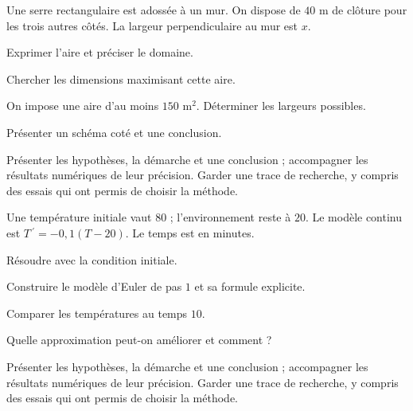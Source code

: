 \clearpage\begingroup\renewcommand{\otThumb}{}\renewcommand{\otHeadTag}{D}\label{dossiers}\label{projet-1}
Une serre rectangulaire est adossée à un mur. On dispose de $40$ m de clôture pour les trois autres côtés. La largeur perpendiculaire au mur est $x$.
\begin{questions}
\item Exprimer l’aire et préciser le domaine.
\item Chercher les dimensions maximisant cette aire.
\item On impose une aire d’au moins $150$ m$^2$. Déterminer les largeurs possibles.
\item Présenter un schéma coté et une conclusion.
\end{questions}
\vspace{5mm}\noindent Présenter les hypothèses, la démarche et une conclusion ; accompagner les résultats numériques de leur précision. Garder une trace de recherche, y compris des essais qui ont permis de choisir la méthode.\par\vfill{}\par\vspace{2mm}\noindent{}
\label{projet-2}
Une température initiale vaut $80$ ; l’environnement reste à $20$. Le modèle continu est $T\,\!^{\prime}=-0{,}1(T-20)$. Le temps est en minutes.
\begin{questions}
\item Résoudre avec la condition initiale.
\item Construire le modèle d’Euler de pas $1$ et sa formule explicite.
\item Comparer les températures au temps $10$.
\item Quelle approximation peut-on améliorer et comment ?
\end{questions}
\vspace{5mm}\noindent Présenter les hypothèses, la démarche et une conclusion ; accompagner les résultats numériques de leur précision. Garder une trace de recherche, y compris des essais qui ont permis de choisir la méthode.\par\vfill{}\par\vspace{2mm}\noindent{}
